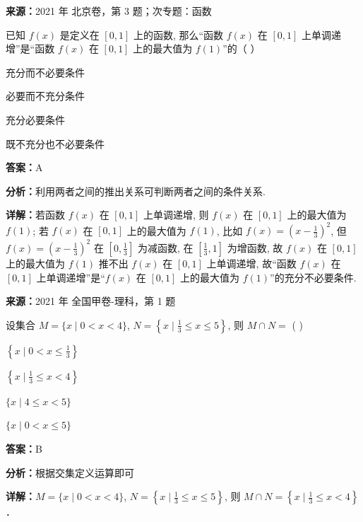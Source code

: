 \begin{question}[points=4]
\textbf{来源：}2021 年 北京卷，第 3 题；次专题：函数\par
已知 $f(x)$ 是定义在 $[0,1]$ 上的函数, 那么“函数 $f(x)$ 在 $[0,1]$ 上单调递增”是“函数 $f(x)$ 在 $[0,1]$ 上的最大值为 $f(1)$”的（ ）
\begin{choices}
  \item 充分而不必要条件
  \item 必要而不充分条件
  \item 充分必要条件
  \item 既不充分也不必要条件
\end{choices}
\begin{solution}
\textbf{答案：}A

\textbf{分析：}利用两者之间的推出关系可判断两者之间的条件关系.

\textbf{详解：}若函数 $f(x)$ 在 $[0,1]$ 上单调递增, 则 $f(x)$ 在 $[0,1]$ 上的最大值为 $f(1)$; 若 $f(x)$ 在 $[0,1]$ 上的最大值为 $f(1)$, 比如 $f(x)=\left(x-\frac{1}{3}\right)^2$, 但 $f(x)=\left(x-\frac{1}{3}\right)^2$ 在 $\left[0,\frac{1}{3}\right]$ 为减函数, 在 $\left[\frac{1}{3},1\right]$ 为增函数, 故 $f(x)$ 在 $[0,1]$ 上的最大值为 $f(1)$ 推不出 $f(x)$ 在 $[0,1]$ 上单调递增, 故“函数 $f(x)$ 在 $[0,1]$ 上单调递增”是“$f(x)$ 在 $[0,1]$ 上的最大值为 $f(1)$”的充分不必要条件.
\end{solution}
\end{question}

\begin{question}[points=5]
\textbf{来源：}2021 年 全国甲卷-理科，第 1 题\par
设集合 $M = \{x \mid 0 < x < 4\}$, $N = \left\{x \mid \frac{1}{3} \le x \le 5\right\}$, 则 $M \cap N =$ ( )
\begin{choices}
  \item $\left\{x \mid 0 < x \le \frac{1}{3}\right\}$
  \item $\left\{x \mid \frac{1}{3} \le x < 4\right\}$
  \item $\{x \mid 4 \le x < 5\}$
  \item $\{x \mid 0 < x \le 5\}$
\end{choices}
\begin{solution}
\textbf{答案：}B

\textbf{分析：}根据交集定义运算即可

\textbf{详解：}$M = \{x \mid 0 < x < 4\}$, $N = \left\{x \mid \frac{1}{3} \le x \le 5\right\}$, 则 $M \cap N = \left\{x \mid \frac{1}{3} \le x < 4\right\}$．
\end{solution}
\end{question}

